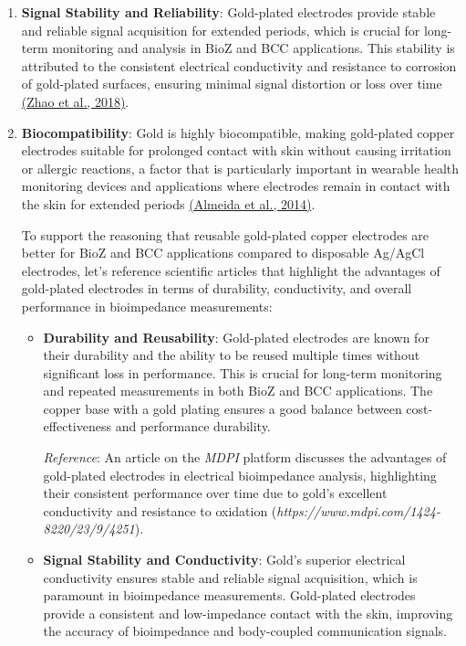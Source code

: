 {\begin{enumerate}
    \item \textbf{Signal Stability and Reliability}: Gold-plated electrodes provide stable and reliable signal acquisition for extended periods, which is crucial for long-term monitoring and analysis in BioZ and BCC applications. This stability is attributed to the consistent electrical conductivity and resistance to corrosion of gold-plated surfaces, ensuring minimal signal distortion or loss over time \href{https://consensus.app/papers/fabrication-flexible-stretchable-nanostructured-gold-zhao/57710c3c09fc5a78985f841d4809eada/?utm_source=chatgpt}{(Zhao et al., 2018)}.

    \item \textbf{Biocompatibility}: Gold is highly biocompatible, making gold-plated copper electrodes suitable for prolonged contact with skin without causing irritation or allergic reactions, a factor that is particularly important in wearable health monitoring devices and applications where electrodes remain in contact with the skin for extended periods \href{https://consensus.app/papers/onsite-fuel-electroanalysis-determination-lead-copper-almeida/91bc0dde8e93533dba0e38522669a3ec/?utm_source=chatgpt}{(Almeida et al., 2014)}.

    To support the reasoning that reusable gold-plated copper electrodes are better for BioZ and BCC applications compared to disposable Ag/AgCl electrodes, let's reference scientific articles that highlight the advantages of gold-plated electrodes in terms of durability, conductivity, and overall performance in bioimpedance measurements:

\begin{itemize}
    \item \textbf{Durability and Reusability}: Gold-plated electrodes are known for their durability and the ability to be reused multiple times without significant loss in performance. This is crucial for long-term monitoring and repeated measurements in both BioZ and BCC applications. The copper base with a gold plating ensures a good balance between cost-effectiveness and performance durability. 
    
    \textit{Reference}: An article on the \textit{MDPI} platform discusses the advantages of gold-plated electrodes in electrical bioimpedance analysis, highlighting their consistent performance over time due to gold's excellent conductivity and resistance to oxidation (\textit{https://www.mdpi.com/1424-8220/23/9/4251}).
    
    \item \textbf{Signal Stability and Conductivity}: Gold's superior electrical conductivity ensures stable and reliable signal acquisition, which is paramount in bioimpedance measurements. Gold-plated electrodes provide a consistent and low-impedance contact with the skin, improving the accuracy of bioimpedance and body-coupled communication signals.
    

\end{itemize}
\end{enumerate}}

